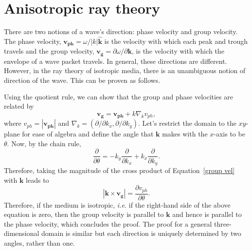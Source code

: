 	\section{Anisotropic ray theory}
	\label{sec: aniso ray}
		
	There are two notions of a wave's direction: phase velocity and group velocity. The phase velocity, $\mathbf{v_{ph}} = \omega / |k| \mathbf{\widehat{k}}$ is the velocity with which each peak and trough travels and the group velocity, $\mathbf{v_g} = \partial \omega / \partial \mathbf{k}$, is the velocity with which the envelope of a wave packet travels. In general, these directions are different. However, in the ray theory of isotropic media, there is an unambiguous notion of direction of the wave. This can be proven as follows.
	
	Using the quotient rule, we can show that the group and phase velocities are related by
	\begin{equation}
	\mathbf{v_g} = \mathbf{v_{ph}} + k\nabla_k v_{ph}, \label{group vel}
	\end{equation}
	where $v_{ph} = |\mathbf{v_{ph}}|$ and $\nabla_k = (\partial/\partial k_x, \partial/\partial k_y)$. Let's restrict the domain to the $xy$-plane for ease of algebra and define the angle that $\mathbf{k}$ makes with the $x$-axis to be $\theta$. Now, by the chain rule,
	\begin{equation}
	\frac{\partial}{\partial \theta} = -k_y \frac{\partial}{\partial k_x} + k_x \frac{\partial}{\partial k_y}.
	\end{equation}
	Therefore, taking the magnitude of the cross product of Equation~\eqref{group vel} with $\mathbf{k}$ leads to
	\begin{equation}
	|\mathbf{k} \times \mathbf{v_g}| = \frac{\partial v_{ph}}{\partial \theta}.
	\end{equation}
	Therefore, if the medium is isotropic, \textit{i.e.} if the right-hand side of the above equation is zero, then the group velocity is parallel to $\mathbf{k}$ and hence is parallel to the phase velocity, which concludes the proof. The proof for a general three-dimensional domain is similar but each direction is uniquely determined by two angles, rather than one.
	
